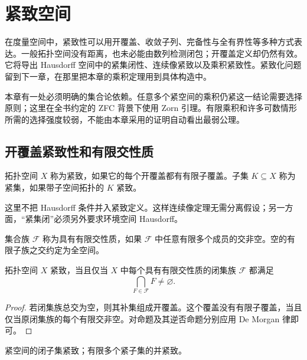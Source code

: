 \chapter{紧致空间}
\label{chap:compact-topological-spaces}

在度量空间中，紧致性可以用开覆盖、收敛子列、完备性与全有界性等多种方式表达。一般拓扑空间没有距离，也未必能由数列检测闭包；开覆盖定义却仍然有效。它将导出 Hausdorff 空间中的紧集闭性、连续像紧致以及乘积紧致性。紧致化问题留到下一章，在那里把本章的乘积定理用到具体构造中。

本章有一处必须明确的集合论依赖。任意多个紧空间的乘积仍紧这一结论需要选择原则；这里在全书约定的 ZFC 背景下使用 Zorn 引理。有限乘积和许多可数情形所需的选择强度较弱，不能由本章采用的证明自动看出最弱公理。

\section{开覆盖紧致性和有限交性质}

\begin{definition}[紧致空间]
拓扑空间 \(X\) 称为紧致，如果它的每个开覆盖都有有限子覆盖。子集 \(K\subseteq X\) 称为紧集，如果带子空间拓扑的 \(K\) 紧致。
\end{definition}

这里不把 Hausdorff 条件并入紧致定义。这样连续像定理无需分离假设；另一方面，“紧集闭”必须另外要求环境空间 Hausdorff。

\begin{definition}[有限交性质]
集合族 \(\mathcal F\) 称为具有有限交性质，如果 \(\mathcal F\) 中任意有限多个成员的交非空。空的有限子族之交约定为全空间。
\end{definition}

\begin{theorem}[紧致性的闭集形式]
\label{thm:compact-fip-equivalence}
拓扑空间 \(X\) 紧致，当且仅当 \(X\) 中每个具有有限交性质的闭集族 \(\mathcal F\) 都满足
\[
 \bigcap_{F\in\mathcal F}F\ne\varnothing.
\]
\end{theorem}

\begin{proof}
若闭集族总交为空，则其补集组成开覆盖。这个覆盖没有有限子覆盖，当且仅当原闭集族的每个有限交非空。对命题及其逆否命题分别应用 De Morgan 律即可。
\end{proof}

\begin{proposition}[闭子集与有限并]
\label{prop:compact-closed-subsets-finite-unions}
紧空间的闭子集紧致；有限多个紧子集的并紧致。
\end{proposition}

